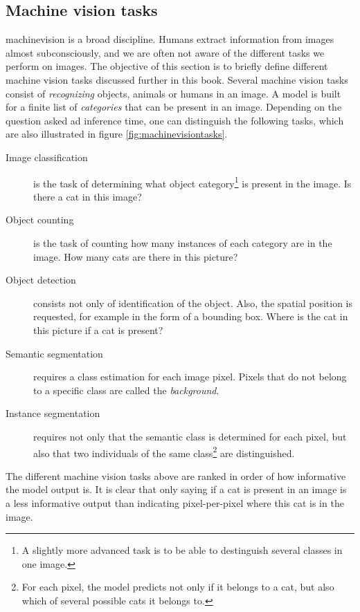 \subsection{Machine vision tasks \label{sec:machinevisiontasks}}
\par{
    \Gls{machinevision} is a broad discipline. 
    Humans extract information from images almost subconsciously, and we are often not aware of the different tasks we perform on images.
    The objective of this section is to briefly define different machine vision tasks discussed further in this book. 
    Several machine vision tasks consist of \textit{recognizing} objects, animals or humans in an image.
    A model is built for a finite list of \textit{categories} that can be present in an image.
    Depending on the question asked ad inference time, one can distinguish the following tasks, which are also illustrated in figure \ref{fig:machinevisiontasks}.
}
\begin{description}
    \item[Image classification] is the task of determining what object category\footnote{A slightly more advanced task is to be able to destinguish several classes in one image.} is present in the image. Is there a cat in this image?
    \item[Object counting] is the task of counting how many instances of each category are in the image. How many cats are there in this picture? 
    \item[Object detection] consists not only of identification of the object. Also, the spatial position is requested, for example in the form of a bounding box. Where is the cat in this picture if a cat is present?
    \item[Semantic segmentation] requires a class estimation for each image pixel. Pixels that do not belong to a specific class are called the \textit{background}.
    \item[Instance segmentation] requires not only that the semantic class is determined for each pixel, but also that two individuals of the same class\footnote{For each pixel, the model predicts not only if it belongs to a cat, but also which of several possible cats it belongs to.} are distinguished.   
\end{description}
\par{
    The different machine vision tasks above are ranked in order of how informative the model output is.
    It is clear that only saying if a cat is present in an image is a less informative output than indicating pixel-per-pixel where this cat is in the image.
}
